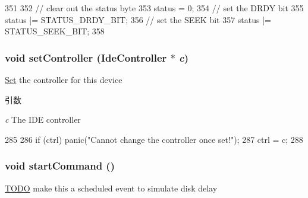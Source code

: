 \begin{DoxyCode}
351     {
352         // clear out the status byte
353         status = 0;
354         // set the DRDY bit
355         status |= STATUS_DRDY_BIT;
356         // set the SEEK bit
357         status |= STATUS_SEEK_BIT;
358     }
\end{DoxyCode}
\hypertarget{classIdeDisk_a2ffee462d2d9876fd5b3c6afc9a491bb}{
\subsubsection[{setController}]{\setlength{\rightskip}{0pt plus 5cm}void setController ({\bf IdeController} $\ast$ {\em c})}}
\label{classIdeDisk_a2ffee462d2d9876fd5b3c6afc9a491bb}
\hyperlink{classSet}{Set} the controller for this device 
\begin{DoxyParams}{引数}
\item[{\em c}]The IDE controller \end{DoxyParams}



\begin{DoxyCode}
285                                          {
286         if (ctrl) panic("Cannot change the controller once set!\n");
287         ctrl = c;
288     }
\end{DoxyCode}
\hypertarget{classIdeDisk_a64f80702e39e45d2a65869911928c8ca}{
\subsubsection[{startCommand}]{\setlength{\rightskip}{0pt plus 5cm}void startCommand ()}}
\label{classIdeDisk_a64f80702e39e45d2a65869911928c8ca}


\begin{Desc}
\item[\hyperlink{todo__todo000059}{TODO}]make this a scheduled event to simulate disk delay \end{Desc}



